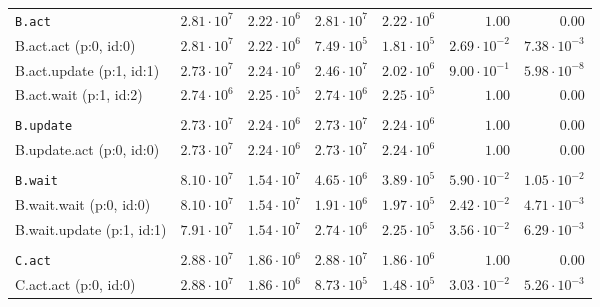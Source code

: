 \begin{table}[htbp]
{\begin{tabular}{lrrrrrr}
\\[-8pt]\texttt{B.act}                & $2.81 \cdot 10^{7}$ & $2.22 \cdot 10^{6}$ & $2.81 \cdot 10^{7}$ & $2.22 \cdot 10^{6}$ &               $1.00$ &               $0.00$ \\
\hspace{3mm}B.act.act (p:0, id:0)     & $2.81 \cdot 10^{7}$ & $2.22 \cdot 10^{6}$ & $7.49 \cdot 10^{5}$ & $1.81 \cdot 10^{5}$ & $2.69 \cdot 10^{-2}$ & $7.38 \cdot 10^{-3}$ \\
\hspace{3mm}B.act.update (p:1, id:1)  & $2.73 \cdot 10^{7}$ & $2.24 \cdot 10^{6}$ & $2.46 \cdot 10^{7}$ & $2.02 \cdot 10^{6}$ & $9.00 \cdot 10^{-1}$ & $5.98 \cdot 10^{-8}$ \\
\hspace{3mm}B.act.wait (p:1, id:2)    & $2.74 \cdot 10^{6}$ & $2.25 \cdot 10^{5}$ & $2.74 \cdot 10^{6}$ & $2.25 \cdot 10^{5}$ &               $1.00$ &               $0.00$ \\
\\[-8pt]\texttt{B.update}             & $2.73 \cdot 10^{7}$ & $2.24 \cdot 10^{6}$ & $2.73 \cdot 10^{7}$ & $2.24 \cdot 10^{6}$ &               $1.00$ &               $0.00$ \\
\hspace{3mm}B.update.act (p:0, id:0)  & $2.73 \cdot 10^{7}$ & $2.24 \cdot 10^{6}$ & $2.73 \cdot 10^{7}$ & $2.24 \cdot 10^{6}$ &               $1.00$ &               $0.00$ \\
\\[-8pt]\texttt{B.wait}               & $8.10 \cdot 10^{7}$ & $1.54 \cdot 10^{7}$ & $4.65 \cdot 10^{6}$ & $3.89 \cdot 10^{5}$ & $5.90 \cdot 10^{-2}$ & $1.05 \cdot 10^{-2}$ \\
\hspace{3mm}B.wait.wait (p:0, id:0)   & $8.10 \cdot 10^{7}$ & $1.54 \cdot 10^{7}$ & $1.91 \cdot 10^{6}$ & $1.97 \cdot 10^{5}$ & $2.42 \cdot 10^{-2}$ & $4.71 \cdot 10^{-3}$ \\
\hspace{3mm}B.wait.update (p:1, id:1) & $7.91 \cdot 10^{7}$ & $1.54 \cdot 10^{7}$ & $2.74 \cdot 10^{6}$ & $2.25 \cdot 10^{5}$ & $3.56 \cdot 10^{-2}$ & $6.29 \cdot 10^{-3}$ \\
\\[-8pt]\texttt{C.act}                & $2.88 \cdot 10^{7}$ & $1.86 \cdot 10^{6}$ & $2.88 \cdot 10^{7}$ & $1.86 \cdot 10^{6}$ &               $1.00$ &               $0.00$ \\
\hspace{3mm}C.act.act (p:0, id:0)     & $2.88 \cdot 10^{7}$ & $1.86 \cdot 10^{6}$ & $8.73 \cdot 10^{5}$ & $1.48 \cdot 10^{5}$ & $3.03 \cdot 10^{-2}$ & $5.26 \cdot 10^{-3}$ \\

\end{tabular}}
\end{table}
